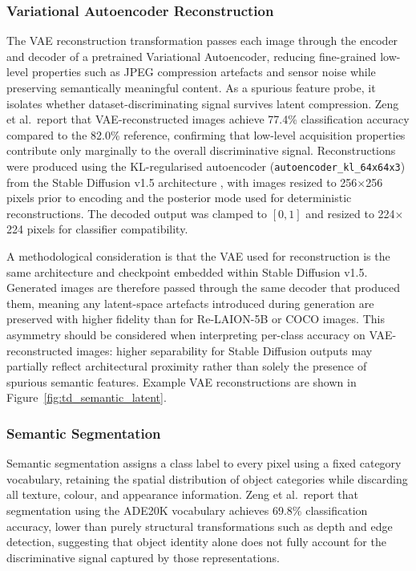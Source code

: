 \subsubsection{Variational Autoencoder Reconstruction}
\label{subsec:vae}

The VAE reconstruction transformation passes each image through the encoder and decoder of a pretrained Variational Autoencoder, reducing fine-grained low-level properties such as JPEG compression artefacts and sensor noise while preserving semantically meaningful content. As a spurious feature probe, it isolates whether dataset-discriminating signal survives latent compression. Zeng et al.\ report that VAE-reconstructed images achieve 77.4\% classification accuracy compared to the 82.0\% reference, confirming that low-level acquisition properties contribute only marginally to the overall discriminative signal. Reconstructions were produced using the KL-regularised autoencoder (\texttt{autoencoder\_kl\_64x64x3}) from the Stable Diffusion v1.5 architecture \cite{Rombach_2022_CVPR}, with images resized to 256$\times$256 pixels prior to encoding and the posterior mode used for deterministic reconstructions. The decoded output was clamped to $[0, 1]$ and resized to 224$\times$224 pixels for classifier compatibility.

A methodological consideration is that the VAE used for reconstruction is the same architecture and checkpoint embedded within Stable Diffusion v1.5. Generated images are therefore passed through the same decoder that produced them, meaning any latent-space artefacts introduced during generation are preserved with higher fidelity than for Re-LAION-5B or COCO images. This asymmetry should be considered when interpreting per-class accuracy on VAE-reconstructed images: higher separability for Stable Diffusion outputs may partially reflect architectural proximity rather than solely the presence of spurious semantic features. Example VAE reconstructions are shown in Figure~\ref{fig:td_semantic_latent}.

\subsubsection{Semantic Segmentation}
\label{subsec:segmentation}

Semantic segmentation assigns a class label to every pixel using a fixed category vocabulary, retaining the spatial distribution of object categories while discarding all texture, colour, and appearance information. Zeng et al.\ report that segmentation using the ADE20K vocabulary achieves 69.8\% classification accuracy, lower than purely structural transformations such as depth and edge detection, suggesting that object identity alone does not fully account for the discriminative signal captured by those representations.

